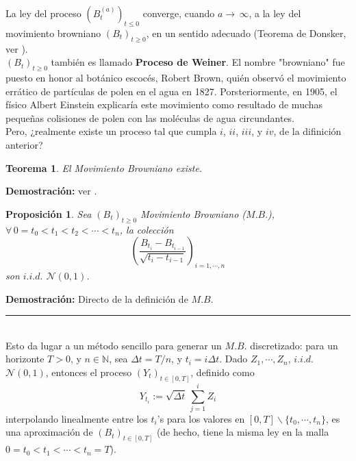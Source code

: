 \documentclass[a4paper]{article}
\newtheorem{teorema}{Teorema}
\newtheorem{prop}{Proposici\'on}
\numberwithin{equation}{subsection}
\numberwithin{definicion}{subsection}
\def\N{\mathbb N}
\begin{document}
La ley del proceso $(B_t^{(a)})_{t\leq 0}$ converge, cuando $a\rightarrow\,\infty$, a la ley del movimiento browniano $(B_t)_{t\geq 0}$, en un sentido adecuado (Teorema de Donsker, ver \cite[cap.2, Teo.4.2]{Kara}).\\ \newline $(B_t)_{t\geq 0}$ también es llamado \textbf{Proceso de Weiner}. El nombre "browniano" fue puesto en honor al botánico escocés, Robert Brown, quién observó el movimiento errático de partículas de polen en el agua en 1827. Porsteriormente, en 1905, el físico Albert Einstein explicaría este movimiento como resultado  de muchas pequeñas colisiones de polen con las moléculas de agua circundantes.\\ \newline
Pero, ¿realmente existe un proceso tal que cumpla $i$, $ii$, $iii$, y $iv$, de la difinición anterior?
\begin{teorema}
El Movimiento Browniano existe.
\end{teorema}
\textbf{Demostración: }ver \cite[cap. 2]{Kara}.\\ \newline

\begin{prop}Sea $(B_t)_{t\geq 0}$ Movimiento Browniano ($M.B.$), $\forall\, 0=t_0<t_1<t_2<\cdots<t_n$, la colección
\[\left(\frac{B_{t_i}-B_{t_{i-1}}}{\sqrt{t_i-t_{i-1}}}\right)_{i=1,\cdots,n}\]
son $i.i.d.$ $\mathcal{N}(0,1)$.
\end{prop}
\textbf{Demostración: }Directo de la definición de $M.B$.\\\rule{0.7em}{0.7em}\\ \newline
Esto da lugar  a un método sencillo para generar un $M.B.$ discretizado: para un horizonte $T>0$, y $n\in\N$, sea $\Delta t = T/n$, y $t_i = i\Delta t$. Dado $Z_1,\cdots, Z_n$,  $i.i.d.$ $\mathcal{N}(0,1)$, entonces el proceso $(Y_t)_{t\in [0,T]}$, definido como 
\[Y_{t_i}:= \sqrt{\Delta t}\,\sum_{j=1}^i Z_i\]
interpolando linealmente entre los $t_i$'s para los valores en $[0,T]\backslash\{t_0,\cdots,t_n\}$, es una aproximación de $(B_t)_{t\in[0,T]}$ (de hecho, tiene la misma ley en la malla $0=t_0<t_1<\cdots<t_n=T$).
\end{document}
